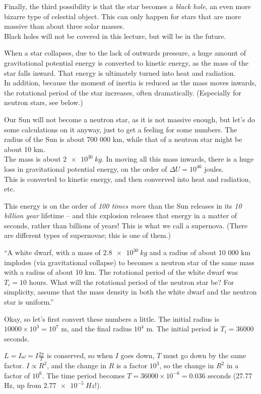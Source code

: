 \documentclass[12pt,a4paper]{report}
\begin{document}
Finally, the third possibility is that the star becomes a \emph{black hole}, an even more bizarre type of celestial object. This can only happen for stars that are more massive than about three solar masses.\\
Black holes will not be covered in this lecture, but will be in the future.

When a star collapses, due to the lack of outwards pressure, a huge amount of gravitational potential energy is converted to kinetic energy, as the mass of the star falls inward. That energy is ultimately turned into heat and radiation.\\
In addition, because the moment of inertia is reduced as the mass moves inwards, the rotational period of the star increases, often dramatically. (Especially for neutron stars, see below.)

Our Sun will not become a neutron star, as it is not massive enough, but let's do some calculations on it anyway, just to get a feeling for some numbers. The radius of the Sun is about 700 000 km, while that of a neutron star might be about 10 km.\\
The mass is about $\SI{2e30}{kg}$. In moving all this mass inwards, there is a huge loss in gravitational potential energy, on the order of $\Delta U = 10^{46}$ joules.\\
This is converted to kinetic energy, and then converved into heat and radiation, etc.

This energy is on the order of \emph{100 times more} than the Sun releases in its \emph{10 billion year} lifetime -- and this explosion releases that energy in a matter of seconds, rather than billions of years! This is what we call a supernova. (There are different types of supernovae; this is one of them.)

``A white dwarf, with a mass of $\SI{2.8e30}{kg}$ and a radius of about 10 000 km implodes (via gravitational collapse) to becomes a neutron star of the same mass with a radius of about 10 km. The rotational period of the white dwarf was $T_i = 10$ hours. What will the rotational period of the neutron star be? For simplicity, assume that the mass density in both the white dwarf and the neutron star is uniform.''

Okay, so let's first convert these numbers a little. The initial radius is $10000\times10^3 = 10^7$ m, and the final radius $10^4$ m. The initial period is $T_i = 36000$ seconds.

$\displaystyle L = I \omega = I \frac{2 \pi}{T}$ is conserved, so when $I$ goes down, $T$ must go down by the same factor. $I \propto R^2$, and the change in $R$ is a factor $10^3$, so the change in $R^2$ in a factor of $10^6$. The time period becomes $T = 36000 \times 10^{-6} = 0.036$ seconds (27.77 Hz, up from $\SI{2.77e-5}{Hz}$!).
\end{document}
